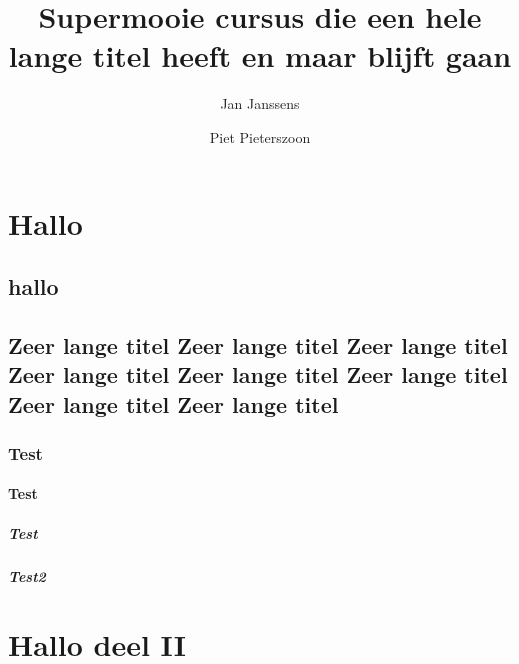 \documentclass[11pt,dutch,faculty=ea,layout=titlefont,underline=false,titleUppercase=true,titleUnderline=true]{ugent2016-report}
\author{Jan Janssens \and Piet Pieterszoon}
\title{Supermooie cursus die een hele lange titel heeft en maar blijft gaan}
\begin{document}
    \maketitle
    \tableofcontents

    \part{Hallo}
    \chapter{hallo}
    \lipsum
    \chapter{Zeer lange titel Zeer lange titel Zeer lange titel Zeer lange titel Zeer lange titel Zeer lange titel Zeer lange titel Zeer lange titel}
    \section{Test}
    \lipsum[3]
    \subsection{Test}
    \lipsum
    \subsubsection{Test}
    \lipsum
    \subsubsection{Test2}
    \lipsum[2]
    \part{Hallo deel II}
    \lipsum[5]
\end{document}
